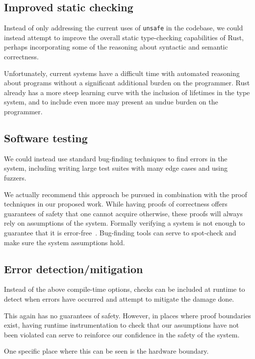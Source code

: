 \documentclass[12pt]{article}
\begin{document}
\subsection{Improved static checking}
Instead of only addressing the current uses of \texttt{unsafe} in the codebase, we could instead attempt to improve the overall static type-checking capabilities of Rust, perhaps incorporating some of the reasoning about syntactic and semantic correctness.

Unfortunately, current systems have a difficult time with automated reasoning about programs without a significant additional burden on the programmer. Rust already has a more steep learning curve with the inclusion of lifetimes in the type system, and to include even more may present an undue burden on the programmer.

\subsection{Software testing}
We could instead use standard bug-finding techniques to find errors in the system, including writing large test suites with many edge cases and using fuzzers. 

We actually recommend this approach be pursued in combination with the proof techniques in our proposed work. While having proofs of correctness offers guarantees of safety that one cannot acquire otherwise, these proofs will always rely on assumptions of the system. Formally verifying a system is not enough to guarantee that it is error-free~\cite{fonseca2017empirical}. Bug-finding tools can serve to spot-check and make sure the system assumptions hold.
    
\subsection{Error detection/mitigation}
Instead of the above compile-time options, checks can be included at runtime to detect when errors have occurred and attempt to mitigate the damage done. 

This again has no guarantees of safety. However, in places where proof boundaries exist, having runtime instrumentation to check that our assumptions have not been violated can serve to reinforce our confidence in the safety of the system.

One specific place where this can be seen is the hardware boundary. %
\end{document}
